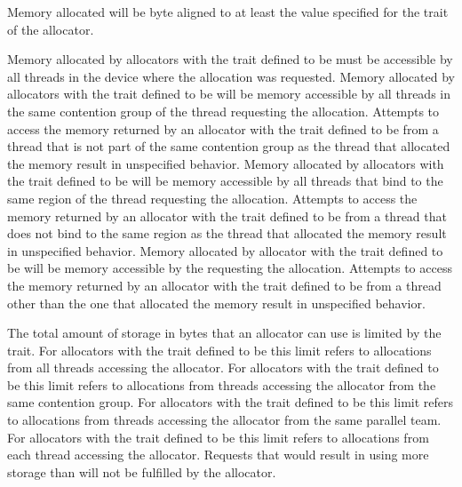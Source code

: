 Memory allocated will be byte aligned to at least the value specified for the {} trait of the allocator.

Memory allocated by allocators with the  trait defined to be  must be accessible by all threads in the device where the allocation was requested. Memory allocated by allocators with the  trait defined to be  will be memory accessible by all threads in the same contention group of the thread requesting the allocation. Attempts to access the memory returned by an allocator with the  trait defined to be  from a thread that is not part of the same contention group as the thread that allocated the memory result in unspecified behavior. Memory allocated by allocators with the  trait defined to be  will be memory accessible by all threads that bind to the same {} region of the thread requesting the allocation. Attempts to access the memory returned by  an allocator with the  trait defined to be  from a thread that does not bind to the same {} region as the thread that allocated the memory result in unspecified behavior. Memory allocated by allocator with the  trait defined to be  will be memory accessible by the {} requesting the allocation. Attempts to access the memory returned by an allocator with the  trait defined to be  from a thread other than the one that allocated the memory result in unspecified behavior.

The total amount of storage in bytes that an allocator can use is limited by the {} trait. For allocators with the  trait defined to be  this limit refers to allocations from all threads accessing the allocator. For allocators with the  trait defined to be  this limit refers to allocations from threads accessing the allocator from the same contention group. For allocators with the  trait defined to be  this limit refers to allocations from threads accessing the allocator from the same parallel team. For allocators with the  trait defined to be  this limit refers to allocations from each thread accessing the allocator. Requests that would result in using more storage than {} will not be fulfilled by the allocator.

